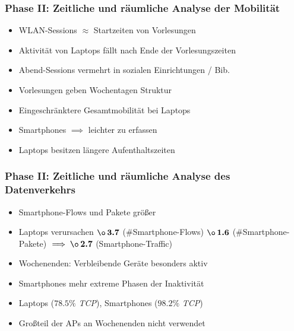 \documentclass{beamer}
\begin{document}
\begin{frame}
  \frametitle{Phase II: Zeitliche und räumliche Analyse der Mobilität}
  \begin{itemize}
    \item WLAN-Sessions $\approx$ Startzeiten von Vorlesungen
    \item Aktivität von Laptops fällt nach Ende der Vorlesungszeiten
    \item Abend-Sessions vermehrt in sozialen Einrichtungen / Bib.
    \item Vorlesungen geben Wochentagen Struktur
    \item Eingeschränktere Gesamtmobilität bei Laptops
    \item Smartphones  $\implies$ leichter zu erfassen
    \item Laptops besitzen längere Aufenthaltszeiten 
  \end{itemize}
\end{frame}

\begin{frame}
  \frametitle{Phase II: Zeitliche und räumliche Analyse des Datenverkehrs}
  \begin{itemize}
    \item Smartphone-Flows und Pakete größer
    \item Laptops verursachen $\boldsymbol{\o \thinspace 3.7}$ (\#Smartphone-Flows)\newline
    \phantom \quad\quad\quad\quad\quad\quad\quad\quad\thinspace\thinspace\thinspace\thinspace\thinspace $\boldsymbol{\o \thinspace 1.6}$ (\#Smartphone-Pakete)\newline
    \phantom \quad\quad\quad\quad\quad\quad\thinspace\thinspace $\implies \boldsymbol{\o \thinspace 2.7}$ (Smartphone-Traffic)
    \item Wochenenden: Verbleibende Geräte besonders aktiv
    \item Smartphones mehr extreme Phasen der Inaktivität
    \item Laptops ($\boldsymbol{78.5 \%}$ \textit{TCP}), Smartphones ($\boldsymbol{98.2 \%}$ \textit{TCP})
    \item Großteil der APs an Wochenenden nicht verwendet
  \end{itemize}
\end{frame}
\end{document}
